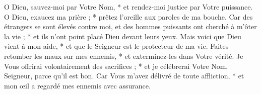  O Dieu, sauvez-moi par Votre Nom, * et rendez-moi justice par Votre puissance.
\versseparator
 O Dieu, exaucez ma prière ; * prêtez l'oreille aux paroles de ma bouche.
\versseparator
 Car des étrangers se sont élevés contre moi, et des hommes puissants ont cherché à m'ôter la vie ; * et ils n'ont point placé Dieu devant leurs yeux.
\versseparator
 Mais voici que Dieu vient à mon aide, * et que le Seigneur est le protecteur de ma vie.
\versseparator
 Faites retomber les maux sur mes ennemis, * et exterminez-les dans Votre vérité.
\versseparator
 Je Vous offrirai volontairement des sacrifices ; * et je célébrerai Votre Nom, Seigneur, parce qu'il est bon.
\versseparator
 Car Vous m'avez délivré de toute affliction, * et mon œil a regardé mes ennemis avec assurance.